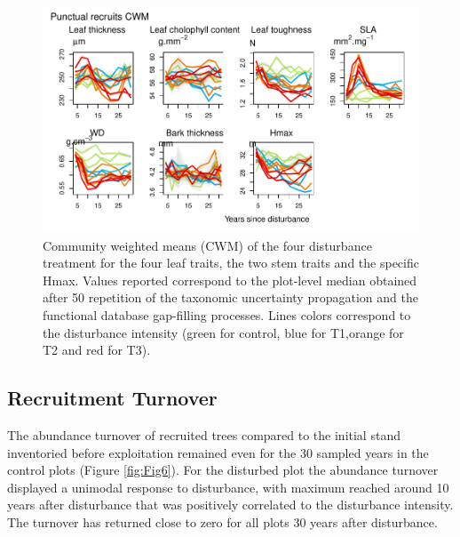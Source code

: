 \documentclass[fleqn,10pt]{ArtEcoFoG} %
\begin{document}
\begin{figure}

{\centering \includegraphics[width=0.8\linewidth]{RecruitmentTrajectories_files/figure-latex/Fig5-1} 

}

\caption{Community weighted means (CWM) of the four disturbance treatment for the four leaf traits, the two stem traits  and the specific Hmax. Values reported correspond to the plot-level median obtained after 50 repetition of the taxonomic uncertainty propagation and the functional database gap-filling processes. Lines colors correspond to the disturbance intensity (green for control, blue for T1,orange for T2 and red for T3).}\label{fig:Fig5}
\end{figure}

\subsection{Recruitment Turnover}\label{recruitment-turnover}

The abundance turnover of recruited trees compared to the initial stand
inventoried before exploitation remained even for the 30 sampled years
in the control plots (Figure \ref{fig:Fig6}). For the disturbed plot the
abundance turnover displayed a unimodal response to disturbance, with
maximum reached around 10 years after disturbance that was positively
correlated to the disturbance intensity. The turnover has returned close
to zero for all plots 30 years after disturbance.
\end{document}
